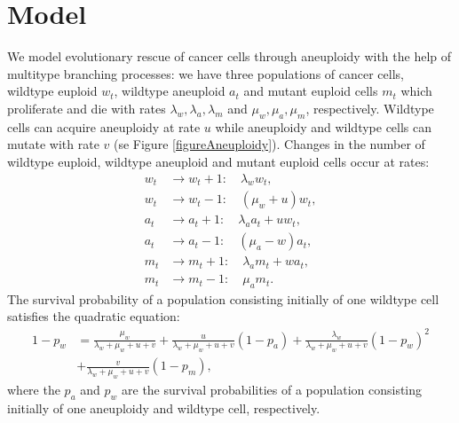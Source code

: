 \documentclass[11pt,a4paper]{article}
\begin{document}
\section{Model}
We model evolutionary rescue of cancer cells through aneuploidy with the help of multitype branching processes: we have three populations of cancer cells, wildtype euploid $w_t$, wildtype aneuploid $a_t$ and mutant euploid cells $m_t$ which proliferate and die with rates $\lambda_w,  \lambda_a,  \lambda_m$ and $\mu_w, \mu_a, \mu_m$, respectively. Wildtype cells can acquire aneuploidy at rate $u$ while aneuploidy and wildtype cells can mutate with rate $v$ (se Figure \ref{figureAneuploidy}). Changes in the number of wildtype euploid, wildtype aneuploid and mutant euploid cells occur at rates:
\begin{align*}
w_t&\rightarrow w_t+1:\quad \lambda_ww_t,\\
w_t&\rightarrow w_t-1:\quad \left(\mu_w+u\right)w_t,\\
a_t&\rightarrow a_t+1:\quad \lambda_aa_t+uw_t,\\
a_t&\rightarrow a_t-1:\quad \left(\mu_a-w\right)a_t,\\
m_t&\rightarrow m_t+1:\quad \lambda_am_t+wa_t,\\
m_t&\rightarrow m_t-1:\quad \mu_am_t.
\end{align*}
The survival probability of a population consisting initially of one wildtype cell satisfies the quadratic equation:
\begin{align}\nonumber
1-p_w&=\frac{\mu_w}{\lambda_w+\mu_w+u+v}+\frac{u}{\lambda_w+\mu_w+u+v}\left(1-p_a\right)+\frac{\lambda_w}{\lambda_w+\mu_w+u+v}\left(1-p_w\right)^2\\ \label{quadraticeqev1}
&+\frac{v}{\lambda_w+\mu_w+u+v}\left(1-p_m\right),
\end{align}
where the $p_a$ and $p_w$ are the survival probabilities of a population consisting initially of one aneuploidy and wildtype cell, respectively.
\end{document}
